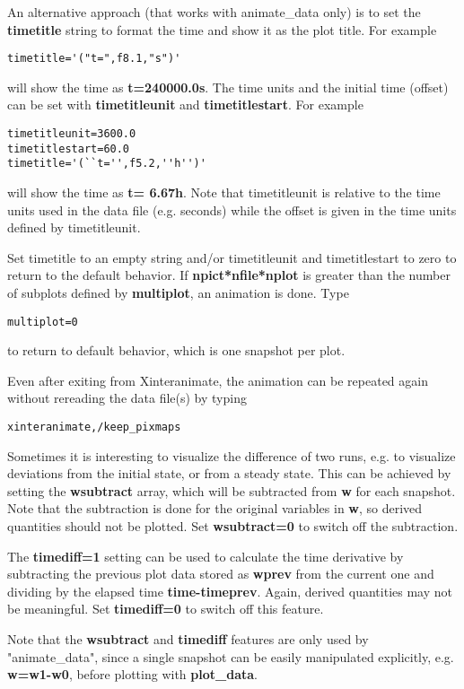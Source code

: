 \documentclass{article}
\begin{document}
An alternative approach (that works with animate\_data only) is to set the 
{\bf timetitle} string to format the time and show it as the plot title.
For example
\begin{verbatim}
timetitle='("t=",f8.1,"s")'
\end{verbatim}
will show the time as {\bf t=240000.0s}. The time units and the
initial time (offset) can be set with {\bf timetitleunit} 
and {\bf timetitlestart}. For example
\begin{verbatim}
timetitleunit=3600.0
timetitlestart=60.0
timetitle='(``t='',f5.2,''h'')'
\end{verbatim}
will show the time as {\bf t= 6.67h}. Note that timetitleunit is
relative to the time units used in the data file (e.g. seconds)
while the offset is given in the time units defined by timetitleunit.

Set timetitle to an empty string and/or timetitleunit and timetitlestart
to zero to return to the default behavior. 
If {\bf npict*nfile*nplot} is greater than the number 
of subplots defined by {\bf multiplot}, an animation is done. 
Type 
\begin{verbatim}
multiplot=0
\end{verbatim}
to return to default behavior, which is one snapshot per plot.

Even after exiting from Xinteranimate, the animation can be repeated
again without rereading the data file(s) by typing
\begin{verbatim}
xinteranimate,/keep_pixmaps
\end{verbatim}
Sometimes it is interesting to visualize the difference of two runs, e.g.
to visualize deviations from the initial state, or from a steady state.
This can be achieved by setting the {\bf wsubtract} array, which will be 
subtracted from {\bf w} for each snapshot. Note that the subtraction is
done for the original variables in {\bf w}, 
so derived quantities should not be plotted. 
Set {\bf wsubtract=0} to switch off the subtraction.

The {\bf timediff=1} setting can be used to calculate the time
derivative by subtracting the previous plot data stored as {\bf wprev}
from the current one and dividing by the elapsed time {\bf time-timeprev}. 
Again, derived quantities may not be meaningful.
Set {\bf timediff=0} to switch off this feature.

Note that the {\bf wsubtract} and {\bf timediff} features are only 
used by "animate\_data", since a single snapshot can be easily 
manipulated explicitly, e.g. {\bf w=w1-w0}, before plotting with
{\bf plot\_data}. 
\end{document}
